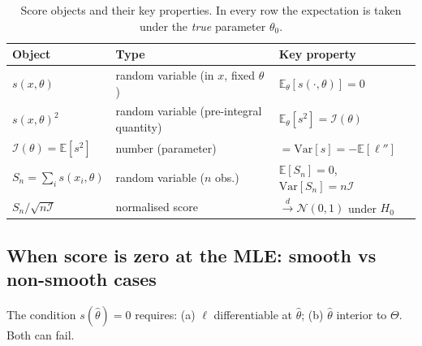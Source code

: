 \documentclass[a4paper,oneside,12pt]{extarticle}
\theoremstyle{plain}
\theoremstyle{definition}
\theoremstyle{remark}
\newcommand*{\E}{\mathbb{E}}
\newcommand*{\Var}{\mathrm{Var}}
\begin{document}
\begin{table}[h]
\centering
\small
\renewcommand{\arraystretch}{1.4}
\begin{tabular}{lll}
\hline
\textbf{Object} & \textbf{Type} & \textbf{Key property} \\
\hline
$s(x,\theta)$ & random variable (in $x$, fixed $\theta$)
  & $\E_\theta[s(\cdot,\theta)]=0$ \\
$s(x,\theta)^2$ & random variable (pre-integral quantity)
  & $\E_\theta[s^2]=\mathcal{I}(\theta)$ \\
$\mathcal{I}(\theta)=\E[s^2]$ & number (parameter)
  & $=\Var[s]=-\E[\ell'']$ \\
$S_n=\sum_i s(x_i,\theta)$ & random variable ($n$ obs.)
  & $\E[S_n]=0$, $\Var[S_n]=n\mathcal{I}$ \\
$S_n/\sqrt{n\mathcal{I}}$ & normalised score
  & $\xrightarrow{d}\mathcal{N}(0,1)$ under $H_0$ \\
\hline
\end{tabular}
\caption{Score objects and their key properties.
  In every row the expectation is taken under the \emph{true}
  parameter $\theta_0$.}
\label{tab:score_objects}
\end{table}

\subsection{When score is zero at the MLE: smooth vs non-smooth cases}
\label{sec:nonsmooth}

The condition $s(\hat\theta)=0$ requires: (a) $\ell$ differentiable
at $\hat\theta$; (b) $\hat\theta$ interior to $\Theta$.  Both can fail.
\end{document}
